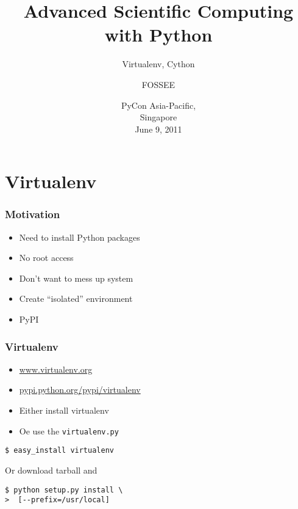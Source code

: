 \documentclass[14pt,compress]{beamer}
\title[Advanced Sci Comp.]{Advanced Scientific Computing with
Python}
\subtitle{Virtualenv, Cython }
\author[FOSSEE] {FOSSEE}
\institute[IIT Bombay] {Department of Aerospace Engineering\\IIT Bombay}
\date[] {PyCon Asia-Pacific,\\
Singapore\\
June 9, 2011
}
\newcommand{\typ}[1]{\lstinline{#1}}
\begin{document}
\begin{frame}
  \maketitle
\end{frame}


\section{Virtualenv}


\begin{frame}
  \frametitle{Motivation}
  \begin{itemize}

      \item Need to install Python packages

      \item No root access

      \item Don't want to mess up system

      \item Create ``isolated'' environment

      \item PyPI
  
  \end{itemize}

\end{frame}

\begin{frame}[fragile]
  \frametitle{Virtualenv}

  \begin{itemize}
    \item  \url{www.virtualenv.org} 

    \item \url{pypi.python.org/pypi/virtualenv}

    \item Either install virtualenv 
        
    \item Oe use the \typ{virtualenv.py}

  \end{itemize}

  \begin{lstlisting}
$ easy_install virtualenv
  \end{lstlisting}
Or download tarball and
  \begin{lstlisting}
$ python setup.py install \
>  [--prefix=/usr/local]
  \end{lstlisting}

\end{frame}
\end{document}
